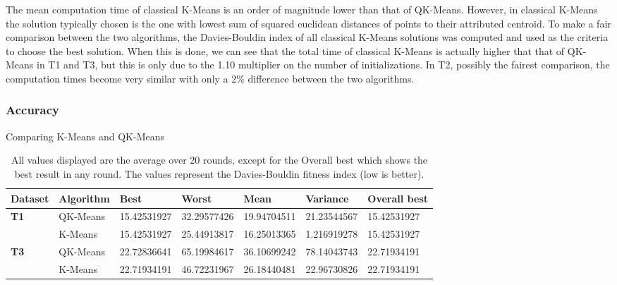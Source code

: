 The mean computation time of classical K-Means is an order of magnitude lower than that of QK-Means. However, in classical K-Means the solution typically chosen is the one with lowest sum of squared euclidean distances of points to their attributed centroid. To make a fair comparison between the two algorithms, the Davies-Bouldin index of all classical K-Means solutions was computed and used as the criteria to choose the best solution. When this is done, we can see that the total time of classical K-Means is actually higher that that of QK-Means in T1 and T3, but this is only due to the 1.10 multiplier on the number of initializations. In T2, possibly the fairest comparison, the computation times become very similar with only a 2\% difference between the two algorithms.

\subsubsection{Accuracy}

Comparing K-Means and QK-Means


\begin{table}[h]
\caption{All values displayed are the average over 20 rounds, except for the Overall best which shows the best result in any round. The values represent the Davies-Bouldin fitness index (low is better).}
\begin{tabular}{|l|l|l|l|l|l|l|}
\hline
\textbf{Dataset} & \textbf{Algorithm} & \textbf{Best} & \textbf{Worst} & \textbf{Mean} & \textbf{Variance} & \textbf{Overall best} \\ \hline
\textbf{T1}      & QK-Means           & 15.42531927   & 32.29577426    & 19.94704511   & 21.23544567       & 15.42531927           \\ \cline{2-7} 
\textbf{}        & K-Means            & 15.42531927   & 25.44913817    & 16.25013365   & 1.216919278       & 15.42531927           \\ \hline
\textbf{T3}      & QK-Means           & 22.72836641   & 65.19984617    & 36.10699242   & 78.14043743       & 22.71934191           \\ \cline{2-7} 
\textbf{}        & K-Means            & 22.71934191   & 46.72231967    & 26.18440481   & 22.96730826       & 22.71934191           \\ \hline
\end{tabular}
\end{table}

